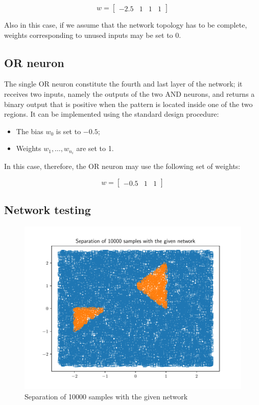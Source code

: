 \documentclass[letterpaper,headings=standardclasses]{scrartcl}
\begin{document}
$$ w = [\begin{matrix} -2.5 & 1 & 1 & 1 \end{matrix}] $$

Also in this case, if we assume that the network topology has to be complete, weights corresponding to unused inputs may be set to 0.

\subsection{OR neuron}

The single OR neuron constitute the fourth and last layer of the network; it receives two inputs, namely the outputs of the two AND neurons, and returns a binary output that is positive when the pattern is located inside one of the two regions. It can be implemented using the standard design procedure:

\begin{itemize}

\item The bias $w_0$ is set to $-0.5$;

\item Weights $w_1,\dots,w_{n_i}$ are set to 1.

\end{itemize}

In this case, therefore, the OR neuron may use the following set of weights:

$$ w = [\begin{matrix} -0.5 & 1 & 1 \end{matrix}] $$

\subsection{Network testing}

\begin{figure}[H]
\centering
\includegraphics[width=.7\linewidth]{sep_10000.pdf}
\caption{Separation of 10000 samples with the given network}
\label{sep_10000}
\end{figure}
\end{document}
